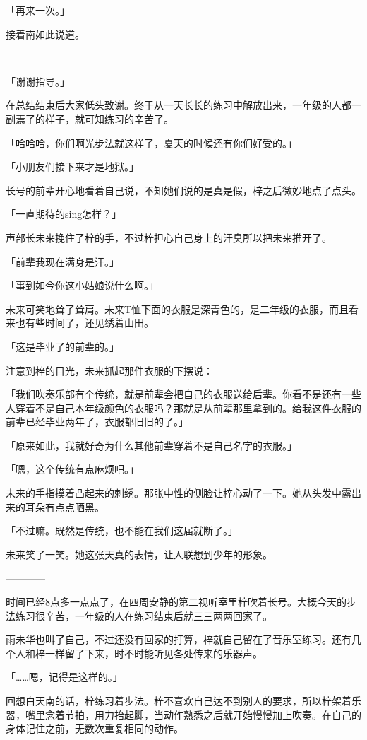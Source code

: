 \documentclass[UTF8]{ctexart}
\begin{document}
    「再来一次。」

    接着南如此说道。

    ————

    「谢谢指导。」

    在总结结束后大家低头致谢。终于从一天长长的练习中解放出来，一年级的人都一副焉了的样子，就可知练习的辛苦了。

    「哈哈哈，你们啊光步法就这样了，夏天的时候还有你们好受的。」

    「小朋友们接下来才是地狱。」

    长号的前辈开心地看着自己说，不知她们说的是真是假，梓之后微妙地点了点头。

    「一直期待的sing怎样？」

    声部长未来挽住了梓的手，不过梓担心自己身上的汗臭所以把未来推开了。

    「前辈我现在满身是汗。」

    「事到如今你这小姑娘说什么啊。」

    未来可笑地耸了耸肩。未来T恤下面的衣服是深青色的，是二年级的衣服，而且看来也有些时间了，还见绣着山田。

    「这是毕业了的前辈的。」

    注意到梓的目光，未来抓起那件衣服的下摆说：

    「我们吹奏乐部有个传统，就是前辈会把自己的衣服送给后辈。你看不是还有一些人穿着不是自己本年级颜色的衣服吗？那就是从前辈那里拿到的。给我这件衣服的前辈已经毕业两年了，衣服都旧旧的了。」

    「原来如此，我就好奇为什么其他前辈穿着不是自己名字的衣服。」

    「嗯，这个传统有点麻烦吧。」

    未来的手指摸着凸起来的刺绣。那张中性的侧脸让梓心动了一下。她从头发中露出来的耳朵有点点晒黑。

    「不过嘛。既然是传统，也不能在我们这届就断了。」

    未来笑了一笑。她这张天真的表情，让人联想到少年的形象。

    ————

    时间已经8点多一点点了，在四周安静的第二视听室里梓吹着长号。大概今天的步法练习很辛苦，一年级的人在练习结束后就三三两两回家了。

    雨未华也叫了自己，不过还没有回家的打算，梓就自己留在了音乐室练习。还有几个人和梓一样留了下来，时不时能听见各处传来的乐器声。

    「……嗯，记得是这样的。」

    回想白天南的话，梓练习着步法。梓不喜欢自己达不到别人的要求，所以梓架着乐器，嘴里念着节拍，用力抬起脚，当动作熟悉之后就开始慢慢加上吹奏。在自己的身体记住之前，无数次重复相同的动作。
\end{document}
